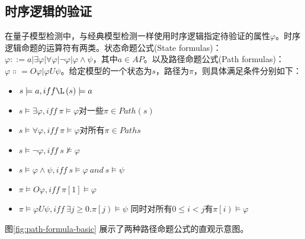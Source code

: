 \subsection{时序逻辑的验证}
在量子模型检测中，与经典模型检测一样使用时序逻辑指定待验证的属性\(\varphi\)。时序逻辑命题的运算符有两类\citep{goranko_2023}。状态命题公式(State formulas)：\(\varphi ::=a\left|\exists\varphi\right|\forall \varphi\left|\lnot\varphi\right|\varphi\land\psi\)，其中\(a\in AP\)。以及路径命题公式(Path formulas)：\(\varphi\Colon=O\varphi|\varphi U\psi\)。给定模型的一个状态为\(s\)，路径为\(\pi\)，则具体满足条件分别如下：
\begin{itemize}
    \item \(s\models a,iff \L\left(s\right)\models a\)
    \item \(s\models\exists\varphi,iff\ \pi\models\varphi\)对一些\(\pi\in Path\left(s\right)\)
    \item \(s\models\forall\varphi,iff\ \pi\models\varphi\)对所有\(π\in Paths\)
    \item \(s\models\lnot\varphi,iff\ s\nvDash\varphi\)
    \item \(s\models\varphi\land\psi,iff\ s\models\varphi\ and\ s\models\psi\)
    \item \(\pi\models O\varphi,iff\ \pi\left[1\right]\models\varphi\)
    \item \(\pi\models\varphi U\psi,iff\ \exists j\geq0\).\(\pi\left[j\right)\models\psi\) 同时对所有\(0\le i<j\)有\(\pi\left[i\right)\models\varphi\)
\end{itemize}


图\ref{fig:path-formula-basic} 展示了两种路径命题公式的直观示意图。


